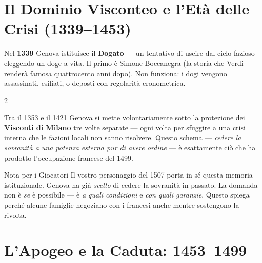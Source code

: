 \section{Il Dominio Visconteo e l'Età delle Crisi (1339–1453)}
\label{sec:crisi}


Nel \textbf{1339} Genova istituisce il \textbf{Dogato} — un tentativo di
uscire dal ciclo fazioso eleggendo un doge a vita. Il primo è Simone
Boccanegra (la storia che Verdi renderà famosa quattrocento anni dopo).
Non funziona: i dogi vengono assassinati, esiliati, o deposti con
regolarità cronometrica.

\begin{multicols}{2}

Tra il 1353 e il 1421 Genova si mette volontariamente sotto la protezione
dei \textbf{Visconti di Milano} tre volte separate — ogni volta per
sfuggire a una crisi interna che le fazioni locali non sanno risolvere.
Questo schema — \textit{cedere la sovranità a una potenza esterna pur di
avere ordine} — è esattamente ciò che ha prodotto l'occupazione francese
del 1499.

\columnbreak

\begin{rulebox}[SharedBrown]{Nota per i Giocatori}
Il vostro personaggio del 1507 porta in sé questa memoria istituzionale.
Genova ha già \textit{scelto} di cedere la sovranità in passato.
La domanda non è \textit{se} è possibile — è \textit{a quali condizioni}
e \textit{con quali garanzie}. Questo spiega perché alcune famiglie
negoziano con i francesi anche mentre sostengono la rivolta.
\end{rulebox}

\end{multicols}

\section{L'Apogeo e la Caduta: 1453–1499}
\label{sec:apogeo}


